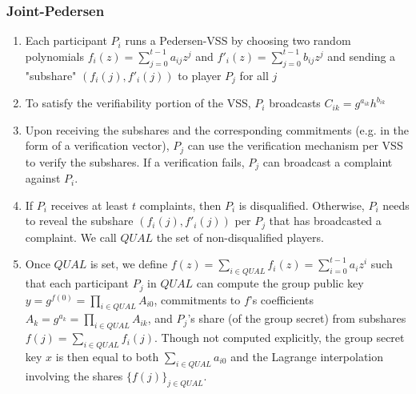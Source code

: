 \documentclass[letterpaper,twocolumn,10pt]{article}
\theoremstyle{definition}
\theoremstyle{remark}
\begin{document}
\subsubsection{Joint-Pedersen}
\begin{enumerate}
\item Each participant $P_i$ runs a Pedersen-VSS by choosing two random polynomials $f_i(z) = \sum_{j = 0}^{t - 1} a_{ij} z^j$ and $f'_i(z) = \sum_{j = 0}^{t - 1} b_{ij} z^j$ and sending a "subshare" $(f_i(j), f'_i(j))$ to player $P_j$ for all $j$
\item To satisfy the verifiability portion of the VSS, $P_i$ broadcasts $C_{ik} = g^{a_{ik}} h^{b_{ik}}$
\item Upon receiving the subshares and the corresponding commitments (e.g. in the form of a verification vector), $P_j$ can use the verification mechanism per VSS to verify the subshares. If a verification fails, $P_j$ can broadcast a complaint against $P_i$.
\item If $P_i$ receives at least $t$ complaints, then $P_i$ is disqualified. Otherwise, $P_i$ needs to reveal the subshare $(f_i(j), f'_i(j))$ per $P_j$ that has broadcasted a complaint. We call $QUAL$ the set of non-disqualified players.
\item Once $QUAL$ is set, we define $f(z) = \sum_{i \in QUAL} f_i(z) = \sum_{i = 0}^{t - 1} a_i z^i$ such that each participant $P_j$ in $QUAL$ can compute the group public key $y = g^{f(0)} = \prod_{i \in QUAL} A_{i0}$, commitments to $f$'s coefficients $A_k = g^{a_k} = \prod_{i \in QUAL} A_{ik}$, and $P_j$'s share (of the group secret) from subshares $f(j) = \sum_{i \in QUAL} f_i(j)$. Though not computed explicitly, the group secret key $x$ is then equal to both $\sum_{i \in QUAL} a_{i0}$ and the Lagrange interpolation involving the shares $\{f(j)\}_{j \in QUAL}$.
\end{enumerate}


\end{document}
